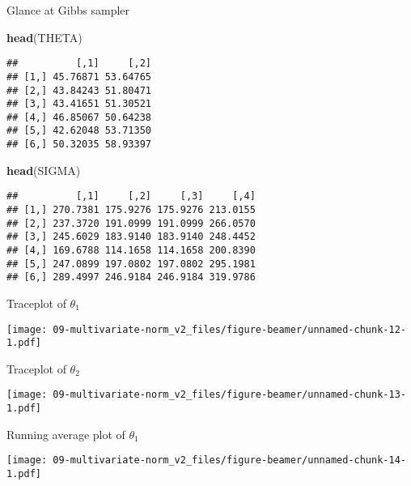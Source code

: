 \documentclass[ignorenonframetext,]{beamer}
\newenvironment{Shaded}{\begin{snugshade}}{\end{snugshade}}
\newcommand{\KeywordTok}[1]{\textcolor[rgb]{0.13,0.29,0.53}{\textbf{#1}}}
\newcommand{\NormalTok}[1]{#1}
\begin{document}
\begin{frame}[fragile]{Glance at Gibbs sampler}

\begin{Shaded}
\begin{Highlighting}[]
\KeywordTok{head}\NormalTok{(THETA)}
\end{Highlighting}
\end{Shaded}

\begin{verbatim}
##          [,1]     [,2]
## [1,] 45.76871 53.64765
## [2,] 43.84243 51.80471
## [3,] 43.41651 51.30521
## [4,] 46.85067 50.64238
## [5,] 42.62048 53.71350
## [6,] 50.32035 58.93397
\end{verbatim}

\begin{Shaded}
\begin{Highlighting}[]
\KeywordTok{head}\NormalTok{(SIGMA)}
\end{Highlighting}
\end{Shaded}

\begin{verbatim}
##          [,1]     [,2]     [,3]     [,4]
## [1,] 270.7381 175.9276 175.9276 213.0155
## [2,] 237.3720 191.0999 191.0999 266.0570
## [3,] 245.6029 183.9140 183.9140 248.4452
## [4,] 169.6788 114.1658 114.1658 200.8390
## [5,] 247.0899 197.0802 197.0802 295.1981
## [6,] 289.4997 246.9184 246.9184 319.9786
\end{verbatim}

\end{frame}

\begin{frame}{Traceplot of \(\theta_1\)}

\texttt{[image: 09-multivariate-norm\_v2\_files/figure-beamer/unnamed-chunk-12-1.pdf]}

\end{frame}

\begin{frame}{Traceplot of \(\theta_2\)}

\texttt{[image: 09-multivariate-norm\_v2\_files/figure-beamer/unnamed-chunk-13-1.pdf]}

\end{frame}

\begin{frame}{Running average plot of \(\theta_1\)}

\texttt{[image: 09-multivariate-norm\_v2\_files/figure-beamer/unnamed-chunk-14-1.pdf]}

\end{frame}
\end{document}
